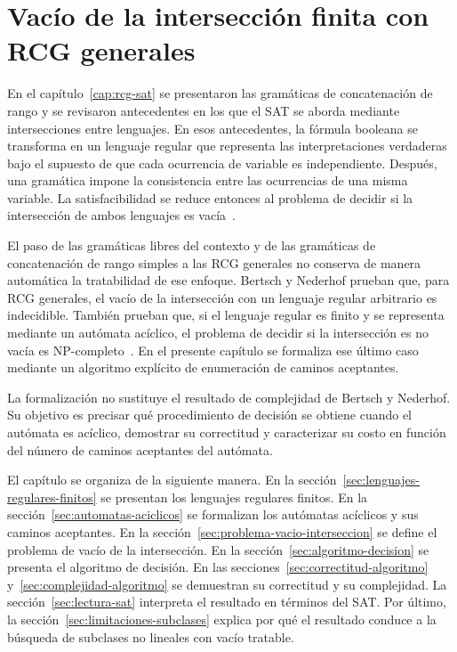 \documentclass{report}
\theoremstyle{definition}
\theoremstyle{plain}
\theoremstyle{remark}
\begin{document}
\setcounter{chapter}{2}
\chapter{Vacío de la intersección finita con RCG generales}
\label{cap:vacio-interseccion-finita}

En el capítulo~\ref{cap:rcg-sat} se presentaron las gramáticas de
concatenación de rango y se revisaron antecedentes en los que el SAT se
aborda mediante intersecciones entre lenguajes. En esos antecedentes, la
fórmula booleana se transforma en un lenguaje regular que representa las
interpretaciones verdaderas bajo el supuesto de que cada ocurrencia de
variable es independiente. Después, una gramática impone la consistencia
entre las ocurrencias de una misma variable. La satisfacibilidad se
reduce entonces al problema de decidir si la intersección de ambos
lenguajes es vacía~\cite{fernandezarias2007,aguileralopez2016}.

El paso de las gramáticas libres del contexto y de las gramáticas de
concatenación de rango simples a las RCG generales no conserva de manera
automática la tratabilidad de ese enfoque. Bertsch y Nederhof prueban
que, para RCG generales, el vacío de la intersección con un lenguaje
regular arbitrario es indecidible. También prueban que, si el lenguaje
regular es finito y se representa mediante un autómata acíclico, el
problema de decidir si la intersección es no vacía es
NP-completo~\cite{bertsch2001rcg}. En el presente capítulo se formaliza
ese último caso mediante un algoritmo explícito de enumeración de
caminos aceptantes.

La formalización no sustituye el resultado de complejidad de
Bertsch y Nederhof. Su objetivo es precisar qué procedimiento de decisión
se obtiene cuando el autómata es acíclico, demostrar su correctitud y
caracterizar su costo en función del número de caminos aceptantes del
autómata.

El capítulo se organiza de la siguiente manera. En la
sección~\ref{sec:lenguajes-regulares-finitos} se presentan los lenguajes
regulares finitos. En la sección~\ref{sec:automatas-aciclicos} se
formalizan los autómatas acíclicos y sus caminos aceptantes. En la
sección~\ref{sec:problema-vacio-interseccion} se define el problema de
vacío de la intersección. En la sección~\ref{sec:algoritmo-decision} se
presenta el algoritmo de decisión. En las
secciones~\ref{sec:correctitud-algoritmo} y~\ref{sec:complejidad-algoritmo}
se demuestran su correctitud y su complejidad. La
sección~\ref{sec:lectura-sat} interpreta el resultado en términos del
SAT. Por último, la sección~\ref{sec:limitaciones-subclases} explica por
qué el resultado conduce a la búsqueda de subclases no lineales con
vacío tratable.
\end{document}
